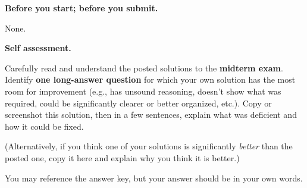 \documentclass[11pt,addpoints,answers]{exam}
\begin{document}
\hwpreface

\pointsinmargin
{}
\marginpointname{ \points}
\marginbonuspointname{ \bonuspoints}

\begin{questions}
  \addtocounter{question}{-1}

  \question[0] \textbf{Before you start; before you submit.}

  
  \begin{solution}
None.
  \end{solution}
  
  \question[10] \textbf{Self assessment.}
  
  Carefully read and understand the posted solutions to the \textbf{midterm exam}.
  Identify \textbf{one long-answer question} for which your own solution has the most room for improvement (e.g., has unsound reasoning, doesn’t show what was required, could be significantly clearer or better organized, etc.).
  Copy or screenshot this solution, then in a few sentences, explain what was deficient and how it could be fixed.

  (Alternatively, if you think one of your solutions is significantly \emph{better} than the posted one, copy it here and explain why you think it is better.)

  You may reference the answer key, but your answer should be in your own words.


\end{questions}
\end{document}
